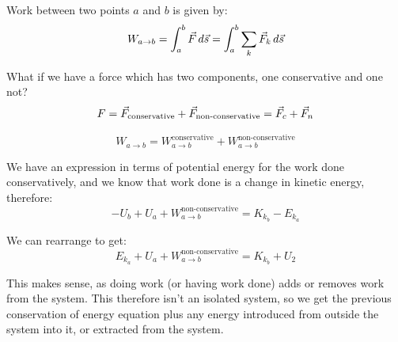 Work between two points $a$ and $b$ is given by:
\[
    W_{a \to b} = \int_{a}^{b} \vec{F} \, d \vec{s} = \int_{a}^{b} \sum_k \vec{F}_k \, d \vec{s}
\]

What if we have a force which has two components, one conservative and one not?
\[
    F = \vec{F}_\text{conservative} + \vec{F}_\text{non-conservative} = \vec{F}_c + \vec{F}_n
\]

\[
    W_{a \to b} = W^\text{conservative}_{a \to b} + W^\text{non-conservative}_{a \to b}
\]

We have an expression in terms of potential energy for the work done conservatively, and we know that work done is a change in kinetic energy, therefore:
\[
    -U_b + U_a +  W^\text{non-conservative}_{a \to b} = K_{k_b} - E_{k_a}
\]

We can rearrange to get:
\[
    \boxed{E_{k_a} + U_a + W^\text{non-conservative}_{a \to b} = K_{k_b} + U_2}
\]

This makes sense, as doing work (or having work done) adds or removes work from the system. This therefore isn't an isolated system, so we get the previous conservation of energy equation plus any energy introduced from outside the system into it, or extracted from the system.